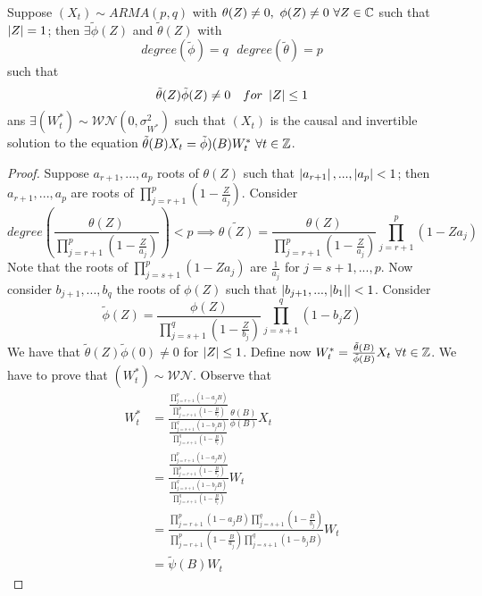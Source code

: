 \begin{theorem}
    \label{theorem11}
    Suppose $(X_t)\sim ARMA(p,q)$ with $\theta(Z)\ne0,\ \phi(Z)\ne0\ \forall Z\in\mathbb{C}$ such that $\left|Z\right|=1$; then $\exists\tilde{\phi}(Z)$ and $\tilde{\theta}(Z)$ with
    \[
        degree(\tilde{\phi})=q\ \ \ degree(\tilde{\theta})=p  
    \]
    such that
    \[
        \tilde{\theta}(Z)\tilde{\phi}(Z)\ne0\ \ \ for\ \abs{Z}\le1  
    \]
    ans $\exists(W_t^*)\sim\mathcal{WN}(0,\sigma_{W^*}^2)$ such that $(X_t)$ is the causal and invertible solution to the equation $\tilde{\theta}(B)X_t=\tilde{\phi})(B)W_t^*\ \forall t\in\mathbb{Z}$.
\end{theorem}

\begin{proof}
    Suppose $a_{r+1},...,a_p$ roots of $\theta(Z)$ such that $\left|a_{r+1}\right|,...,\left|a_p\right|<1$; then $a_{r+1},...,a_p$ are roots of $\prod_{j=r+1}^p\left(1-\frac{Z}{a_j}\right)$. Consider
    \[
        degree\left(\frac{\theta(Z)}{\prod_{j=r+1}^p\left(1-\frac{Z}{a_j}\right)}\right)<p\implies\tilde{\theta(Z)}=\frac{\theta(Z)}{\prod_{j=r+1}^p\left(1-\frac{Z}{a_j}\right)}\prod_{j=r+1}^p(1-Za_j)
    \]
    Note that the roots of $\prod_{j=s+1}^p(1-Za_j)$ are $\frac{1}{a_j}$ for $j=s+1,...,p$. Now consider $b_{j+1},...,b_q$ the roots of $\phi(Z)$ such that $\left|b_{j+1},...,\left|b_1\right|\right|<1$. Consider
    \[
        \tilde{\phi}(Z)=\frac{\phi(Z)}{\prod_{j=s+1}^q\left(1-\frac{Z}{b_j}\right)}\prod_{j=s+1}^q\left(1-b_jZ\right)
    \]
    We have that $\tilde{\theta}(Z)\tilde{\phi}(0)\ne0$ for $\left|Z\right|\le1$. Define now $W_t^*=\frac{\tilde{\theta}(B)}{\tilde{\phi}(B)}X_t\ \forall t\in\Z$. We have to prove that $(W_t^*)\sim \mathcal{WN}$. Observe that
    \begin{equation*}
        \begin{split}
            W_t^*&=\frac{\frac{\prod_{j=r+1}^p(1-a_jB)}{\prod_{j=r+1}^p\left(1-\frac{B}{a_j}\right)}}{\frac{\prod_{j=s+1}^q(1-b_jB)}{\prod_{j=s+1}^q\left(1-\frac{B}{b_j}\right)}}\frac{\theta(B)}{\phi(B)}X_t\\
            &=\frac{\frac{\prod_{j=r+1}^p(1-a_jB)}{\prod_{j=r+1}^p\left(1-\frac{B}{a_j}\right)}}{\frac{\prod_{j=s+1}^q(1-b_jB)}{\prod_{j=s+1}^q\left(1-\frac{B}{b_j}\right)}}W_t\\
            &=\frac{\prod_{j=r+1}^p(1-a_jB)\prod_{j=s+1}^q\left(1-\frac{B}{b_j}\right)}{\prod_{j=r+1}^p\left(1-\frac{B}{a_j}\right)\prod_{j=s+1}^q(1-b_jB)}W_t\\
            &=\tilde{\psi}(B)W_t
        \end{split}
    \end{equation*}

\end{proof}
